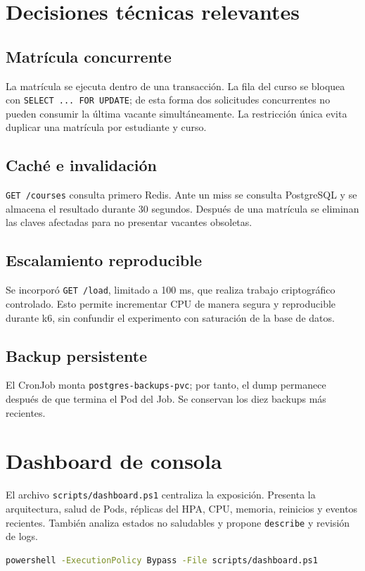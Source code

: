 \documentclass[12pt,a4paper]{article}
\begin{document}
\section{Decisiones técnicas relevantes}
\subsection{Matrícula concurrente}
La matrícula se ejecuta dentro de una transacción. La fila del curso se bloquea con
\texttt{SELECT ... FOR UPDATE}; de esta forma dos solicitudes concurrentes no pueden
consumir la última vacante simultáneamente. La restricción única evita duplicar una
matrícula por estudiante y curso.

\subsection{Caché e invalidación}
\texttt{GET /courses} consulta primero Redis. Ante un miss se consulta PostgreSQL y se
almacena el resultado durante 30 segundos. Después de una matrícula se eliminan las claves
afectadas para no presentar vacantes obsoletas.

\subsection{Escalamiento reproducible}
Se incorporó \texttt{GET /load}, limitado a 100 ms, que realiza trabajo criptográfico
controlado. Esto permite incrementar CPU de manera segura y reproducible durante k6, sin
confundir el experimento con saturación de la base de datos.

\subsection{Backup persistente}
El CronJob monta \texttt{postgres-backups-pvc}; por tanto, el dump permanece después de
que termina el Pod del Job. Se conservan los diez backups más recientes.

\section{Dashboard de consola}
El archivo \texttt{scripts/dashboard.ps1} centraliza la exposición. Presenta la
arquitectura, salud de Pods, réplicas del HPA, CPU, memoria, reinicios y eventos recientes.
También analiza estados no saludables y propone \texttt{describe} y revisión de logs.

\begin{lstlisting}[language=bash,caption={Inicio del centro de demostración}]
powershell -ExecutionPolicy Bypass -File scripts/dashboard.ps1
\end{lstlisting}
\end{document}
